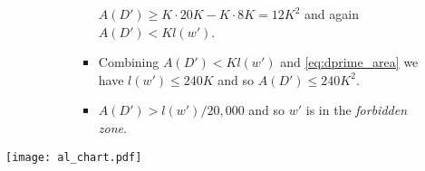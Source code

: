 \documentclass[11pt]{article} \usepackage{amssymb}
\begin{document}
\begin{enumerate}
\begin{itemize}
\begin{enumerate}
\begin{itemize}
\begin{enumerate}
\begin{itemize}
              $A(D')\geq K \cdot 20K - K \cdot 8K=12K^2$ and again 
              $A(D')<Kl(w')$. 
            \item Combining $A(D')<Kl(w')$ and \eqref{eq:dprime_area} we have
              $l(w')\leq 240K$ and so $A(D')\leq 240K^2$.
            \item $A(D')>l(w')/20,000$ and so $w'$ is in the 
              {\em forbidden zone}.
            \end{itemize}
          \end{enumerate}
          
        \end{itemize}
      \end{enumerate}
    \end{itemize}
\end{enumerate}
\begin{figure}[htp]
  \label{fig:axes}
  \centering
  \texttt{[image: al\_chart.pdf]}    
\end{figure}
\end{document}
